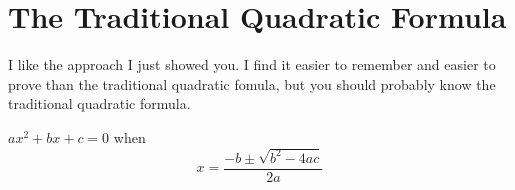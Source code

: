 \section{The Traditional Quadratic Formula}

I like the approach I just showed you. I find it easier to remember
and easier to prove than the traditional quadratic fomula, but you
should probably know the traditional quadratic formula.

\begin{mdframed}[style=important, frametitle={The Quadratic Formula}]

$ax^2 + bx + c = 0$ when
\begin{equation*}
  x = \frac{-b \pm \sqrt{b^2 - 4ac}}{2a}
\end{equation*}

\end{mdframed}
